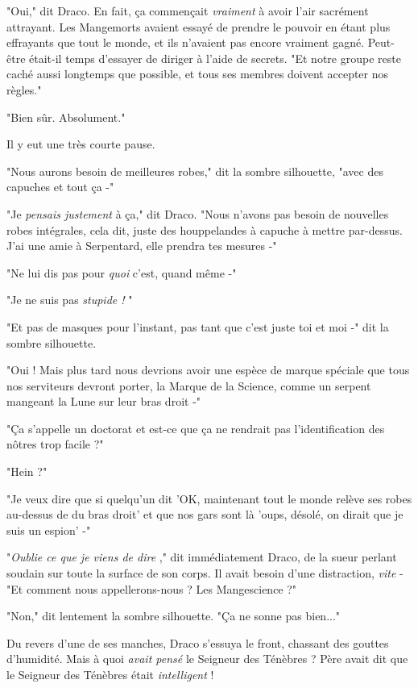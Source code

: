 "Oui," dit Draco. En fait, ça commençait \emph{vraiment}  à avoir l'air sacrément attrayant. Les Mangemorts avaient essayé de prendre le pouvoir en étant plus effrayants que tout le monde, et ils n'avaient pas encore vraiment gagné. Peut-être était-il temps d'essayer de diriger à l'aide de secrets. "Et notre groupe reste caché aussi longtemps que possible, et tous ses membres doivent accepter nos règles."

"Bien sûr. Absolument."

Il y eut une très courte pause.

"Nous aurons besoin de meilleures robes," dit la sombre silhouette, "avec des capuches et tout ça -"

"Je \emph{pensais justement}  à ça," dit Draco. "Nous n'avons pas besoin de nouvelles robes intégrales, cela dit, juste des houppelandes à capuche à mettre par-dessus. J'ai une amie à Serpentard, elle prendra tes mesures -"

"Ne lui dis pas pour \emph{quoi}  c'est, quand même -"

"Je ne suis pas \emph{stupide !} "

"Et pas de masques pour l'instant, pas tant que c'est juste toi et moi -" dit la sombre silhouette.

"Oui ! Mais plus tard nous devrions avoir une espèce de marque spéciale que tous nos serviteurs devront porter, la Marque de la Science, comme un serpent mangeant la Lune sur leur bras droit -"

"Ça s'appelle un doctorat et est-ce que ça ne rendrait pas l'identification des nôtres trop facile ?"

"Hein ?"

"Je veux dire que si quelqu'un dit 'OK, maintenant tout le monde relève ses robes au-dessus de du bras droit' et que nos gars sont là 'oups, désolé, on dirait que je suis un espion' -"

"\emph{Oublie ce que je viens de dire} ," dit immédiatement Draco, de la sueur perlant soudain sur toute la surface de son corps. Il avait besoin d'une distraction, \emph{vite}  - "Et comment nous appellerons-nous ? Les Mangescience ?"

"Non," dit lentement la sombre silhouette. "Ça ne sonne pas bien..."

Du revers d'une de ses manches, Draco s'essuya le front, chassant des gouttes d'humidité. Mais à quoi \emph{avait pensé}  le Seigneur des Ténèbres ? Père avait dit que le Seigneur des Ténèbres était \emph{intelligent}  !

